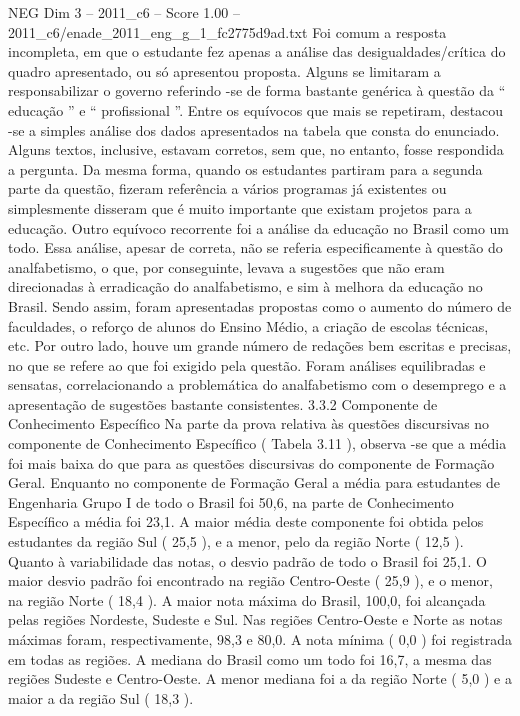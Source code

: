 \begin{textsample}{NEG Dim 3 – 2011\_c6 – Score 1.00 – 2011\_c6/enade\_2011\_eng\_g\_1\_fc2775d9ad.txt}
Foi comum a resposta incompleta, em que o estudante fez apenas a análise das desigualdades/crítica do quadro apresentado, ou só apresentou proposta.
Alguns se limitaram a responsabilizar o governo referindo -se de forma bastante genérica à questão da “ educação ” e “ profissional ”.
Entre os equívocos que mais se repetiram, destacou -se a simples análise dos dados apresentados na tabela que consta do enunciado.
Alguns textos, inclusive, estavam corretos, sem que, no entanto, fosse respondida a pergunta.
Da mesma forma, quando os estudantes partiram para a segunda parte da questão, fizeram referência a vários programas já existentes ou simplesmente disseram que é muito importante que existam projetos para a educação.
Outro equívoco recorrente foi a análise da educação no Brasil como um todo.
Essa análise, apesar de correta, não se referia especificamente à questão do analfabetismo, o que, por conseguinte, levava a sugestões que não eram direcionadas à erradicação do analfabetismo, e sim à melhora da educação no Brasil.
Sendo assim, foram apresentadas propostas como o aumento do número de faculdades, o reforço de alunos do Ensino Médio, a criação de escolas técnicas, etc.
Por outro lado, houve um grande número de redações bem escritas e precisas, no que se refere ao que foi exigido pela questão.
Foram análises equilibradas e sensatas, correlacionando a problemática do analfabetismo com o desemprego e a apresentação de sugestões bastante consistentes. 3.3.2 Componente de Conhecimento Específico Na parte da prova relativa às questões discursivas no componente de Conhecimento Específico ( Tabela 3.11 ), observa -se que a média foi mais baixa do que para as questões discursivas do componente de Formação Geral.
Enquanto no componente de Formação Geral a média para estudantes de Engenharia Grupo I de todo o Brasil foi 50,6, na parte de Conhecimento Específico a média foi 23,1.
A maior média deste componente foi obtida pelos estudantes da região Sul ( 25,5 ), e a menor, pelo da região Norte ( 12,5 ).
Quanto à variabilidade das notas, o desvio padrão de todo o Brasil foi 25,1.
O maior desvio padrão foi encontrado na região Centro-Oeste ( 25,9 ), e o menor, na região Norte ( 18,4 ).
A maior nota máxima do Brasil, 100,0, foi alcançada pelas regiões Nordeste, Sudeste e Sul.
Nas regiões Centro-Oeste e Norte as notas máximas foram, respectivamente, 98,3 e 80,0.
A nota mínima ( 0,0 ) foi registrada em todas as regiões.
A mediana do Brasil como um todo foi 16,7, a mesma das regiões Sudeste e Centro-Oeste.
A menor mediana foi a da região Norte ( 5,0 ) e a maior a da região Sul ( 18,3 ).

\end{textsample}
